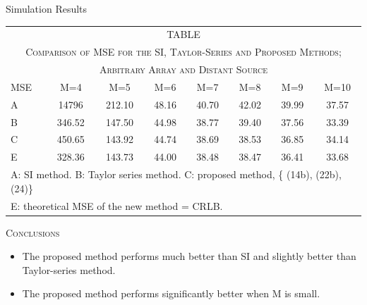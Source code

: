 \documentclass[10pt]{beamer}
\begin{document}
\begin{frame}{Simulation Results}
  \begin{center}
  \begin{tabular}{l c c c c c c c}\\
  \multicolumn{8}{c}{TABLE \uppercase\expandafter{\romannumeral3}}\\
  \multicolumn{8}{c}{\textsc{\tiny Comparison of MSE for the SI, Taylor-Series and Proposed Methods;}}\\
  \multicolumn{8}{c}{\textsc{\tiny Arbitrary Array and Distant Source}}\\\hline
  \scriptsize MSE & \scriptsize  M=4   &  \scriptsize M=5    & \scriptsize  M=6   & \scriptsize  M=7   &  \scriptsize M=8   &  \scriptsize M=9   &  \scriptsize M=10   \\\hline
  \scriptsize A   & \scriptsize  14796 &  \scriptsize 212.10 & \scriptsize  48.16 & \scriptsize  40.70 & \scriptsize  42.02 &  \scriptsize 39.99 &  \scriptsize 37.57  \\
  \scriptsize B   &  \scriptsize 346.52&  \scriptsize 147.50 &  \scriptsize 44.98 &  \scriptsize 38.77 &  \scriptsize 39.40 &  \scriptsize 37.56 &  \scriptsize 33.39  \\
  \scriptsize C   &  \scriptsize 450.65&  \scriptsize 143.92 &  \scriptsize 44.74 &  \scriptsize 38.69 &  \scriptsize 38.53 &  \scriptsize 36.85 &  \scriptsize 34.14   \\
  \scriptsize E   &  \scriptsize 328.36&   \scriptsize 143.73&  \scriptsize 44.00 &  \scriptsize 38.48 &  \scriptsize 38.47 &  \scriptsize 36.41 &  \scriptsize 33.68  \\\hline
  \multicolumn{8}{l}{\tiny A: SI method. B: Taylor series method. C: proposed method, \{ (14b), (22b), (24)\}}\\
  \multicolumn{8}{l}{\tiny E: theoretical MSE of the new method = CRLB.}
  \end{tabular}
  \end{center}
  \begin{center} \textsc{Conclusions} \end{center}
  \begin{itemize}
		\item \small The proposed method performs much better than SI and slightly better than Taylor-series method.
		\item \small The proposed method performs significantly better when M is small.
	\end{itemize}

\end{frame}
\end{document}
